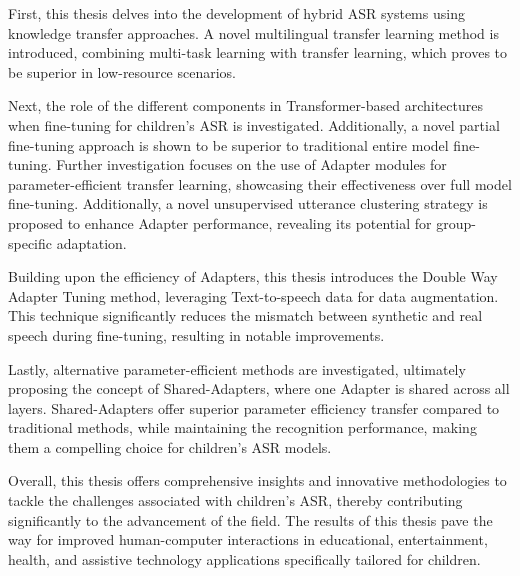 First, this thesis delves into the development of hybrid ASR systems using knowledge transfer approaches. A novel multilingual transfer learning method is introduced, combining multi-task learning with transfer learning, which proves to be superior in low-resource scenarios.

Next, the role of the different components in Transformer-based architectures when fine-tuning for children's ASR is investigated. Additionally, a novel partial fine-tuning approach is shown to be superior to traditional entire model fine-tuning. Further investigation focuses on the use of Adapter modules for parameter-efficient transfer learning, showcasing their effectiveness over full model fine-tuning. Additionally, a novel unsupervised utterance clustering strategy is proposed to enhance Adapter performance, revealing its potential for group-specific adaptation. 

Building upon the efficiency of Adapters, this thesis introduces the Double Way Adapter Tuning method, leveraging Text-to-speech data for data augmentation. This technique significantly reduces the mismatch between synthetic and real speech during fine-tuning, resulting in notable improvements.

Lastly, alternative parameter-efficient methods are investigated, ultimately proposing the concept of Shared-Adapters, where one Adapter is shared across all layers. Shared-Adapters offer superior parameter efficiency transfer compared to traditional methods, while maintaining the recognition performance, making them a compelling choice for children's ASR models.

Overall, this thesis offers comprehensive insights and innovative methodologies to tackle the challenges associated with children's ASR, thereby contributing significantly to the advancement of the field. The results of this thesis pave the way for improved human-computer interactions in educational, entertainment, health, and assistive technology applications specifically tailored for children. 
\newpage